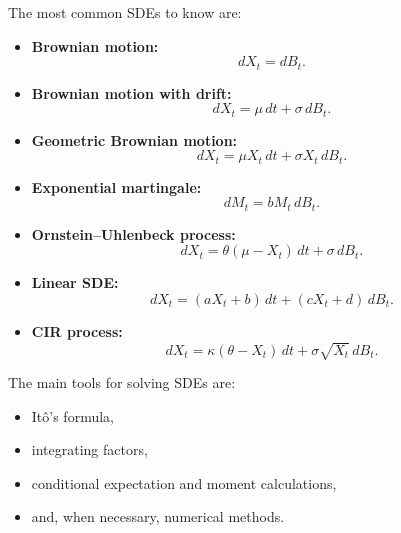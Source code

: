 \documentclass[11pt]{article}
\theoremstyle{definition}
\begin{document}
\begin{summarybox}
The most common SDEs to know are:
\begin{itemize}[leftmargin=2em]
    \item \textbf{Brownian motion:}
    \[
    dX_t=dB_t.
    \]

    \item \textbf{Brownian motion with drift:}
    \[
    dX_t=\mu\,dt+\sigma\,dB_t.
    \]

    \item \textbf{Geometric Brownian motion:}
    \[
    dX_t=\mu X_t\,dt+\sigma X_t\,dB_t.
    \]

    \item \textbf{Exponential martingale:}
    \[
    dM_t=bM_t\,dB_t.
    \]

    \item \textbf{Ornstein--Uhlenbeck process:}
    \[
    dX_t=\theta(\mu-X_t)\,dt+\sigma\,dB_t.
    \]

    \item \textbf{Linear SDE:}
    \[
    dX_t=(aX_t+b)\,dt+(cX_t+d)\,dB_t.
    \]

    \item \textbf{CIR process:}
    \[
    dX_t=\kappa(\theta-X_t)\,dt+\sigma\sqrt{X_t}\,dB_t.
    \]
\end{itemize}

The main tools for solving SDEs are:
\begin{itemize}[leftmargin=2em]
    \item It\^o's formula,
    \item integrating factors,
    \item conditional expectation and moment calculations,
    \item and, when necessary, numerical methods.
\end{itemize}
\end{summarybox}
\end{document}
